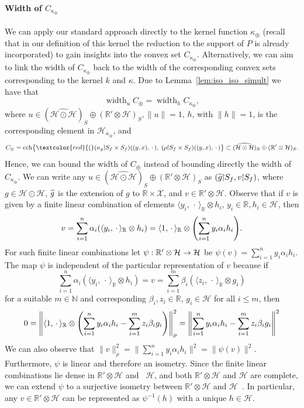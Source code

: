\documentclass[10pt]{amsart}
\theoremstyle{definition}\newtheorem{defi}[theo]{Definition}\newtheorem{rema}[theo]{Remark}\newtheorem{exam}[theo]{Example}\newtheorem{exem}[theo]{Example}\newtheorem{nota}[theo]{Notation}
\theoremstyle{remark}
\DeclareMathOperator{\cch}{cch}
\DeclareMathOperator{\diam}{width}
\newcommand{\restrr}
{\!\!\upharpoonright\!\!}
\newcommand{\R}{\mathbb{R}}
\newcommand{\dR}{{\R'}}
\newcommand{\bbN}{\mathbb{N}}
\newcommand{\X}{\mathcal{X}}
\newcommand{\cH}{\mathcal{H}}
\let\oldhat\hat
\renewcommand*{\hat}[1]{\mathchoice{\widehat{#1}}{\widehat{#1}}{\oldhat{#1}}{\oldhat{#1}}}
\renewcommand*{\to}{\mathchoice{\longrightarrow}{\rightarrow}{\rightarrow}{\rightarrow}}
\let\originalleft\left
\let\originalright\right
\renewcommand{\left}{\mathopen{}\mathclose\bgroup\originalleft}
\renewcommand{\right}{\aftergroup\egroup\originalright}
\begin{document}
\paragraph{Width of $C_{\kappa_\oplus}$}
We can apply our standard approach directly to the kernel function $\kappa_\oplus$ (recall that in our definition of this kernel the reduction to the support of $P$ is already incorporated) to gain insights into the convex set $C_{\kappa_\oplus}$. Alternatively, we can aim to link the width of $C_{\kappa_\oplus}$ back to the width of the corresponding convex sets corresponding to the kernel $k$ and $\kappa$. Due to Lemma~\ref{lem:iso_iso_simult} we have that
\[
\diam_{u} C_{\oplus} = \diam_{h} C_{\kappa_\oplus},
\]
where $u \in (\widehat{\cH \odot \cH})_S \oplus (\R' \otimes \cH)_S, \|u\| =1$, $h$, with $\|h\|=1$, is the corresponding element in $\cH_{\kappa_\oplus}$, and
\[
C_\oplus = \cch\bigl\{ \textcolor{red}{(}(\kappa_y \restrr S_f \times S_f)((y,x),\,\cdot\,),\; (\rho \restrr S_f \times S_f)((y,x),\,\cdot\,)\bigr\}\subset (\widehat{\cH \odot \cH})_S \oplus (\R' \otimes \cH)_S.
\]
Hence, we can bound the width of $C_\oplus$ instead of bounding directly the width of $C_{\kappa_\oplus}$. We can write any $u \in (\widehat{\cH \odot \cH})_S \oplus (\R' \otimes \cH)_S$ as $(\hat g\restrr S_f,v\restrr S_f)$, where $g \in \cH \odot \cH$, $\hat g$ is the extension of $g$ to $\R \times \X$, and $v \in \dR \otimes \cH$. Observe that if $v$ is given by a finite linear combination of elements $\langle y_i,\,\cdot\, \rangle_\R \otimes h_i$, $y_i \in \R, h_i \in \cH$, then
\begin{equation}\label{eq:dir_tens_helper}
v = \sum_{i=1}^n \alpha_i (\langle y_i, \,\cdot\, \rangle_\R \otimes h_i) = \langle 1, \,\cdot\, \rangle_\R \otimes \left(
\sum_{i=1}^n y_i \alpha_i h_i \right).
\end{equation}
For such finite linear combinations let $\psi: \dR \otimes \cH \to \cH$ be $\psi(v) =\sum_{i=1}^n y_i \alpha_i h_i$. The map $\psi$ is independent of the particular representation of $v$ because if
\[
\sum_{i=1}^n \alpha_i (\langle y_i, \,\cdot\, \rangle_\R \otimes h_i) = v = \sum_{i=1}^m \beta_i (\langle z_i, \,\cdot\, \rangle_\R \otimes g_i)
\]
for a suitable $m\in\bbN$ and corresponding $\beta_i,z_i \in \R$, $g_i \in \cH$ for all $i \leq m$, then
\[
0 = \left\| \langle 1, \,\cdot\, \rangle_\R \otimes \left(\sum_{i=1}^n y_i \alpha_i h_i - \sum_{i=1}^m z_i \beta_i g_i\right) \right\|^2_\rho =
\left\|\sum_{i=1}^n y_i \alpha_i h_i - \sum_{i=1}^m z_i \beta_i g_i\right\|^2
\]
We can also observe that $\|v\|^2_\rho = \| \sum_{i=1}^n y_i \alpha_i h_i\|^2 = \|\psi(v)\|^2$. Furthermore, $\psi$ is linear and therefore an isometry. Since the finite linear combinations lie dense in $\dR \otimes \cH$ and ~$\cH$, and both $\dR \otimes \cH$ and $\cH$ are complete, we can extend $\psi$ to a surjective isometry between $\dR \otimes \cH$ and $\cH$~\cite[Corollary~4.3.18]{ENG89}. In particular, any $v \in \dR \otimes \cH$ can be represented as $\psi^{-1}(h)$ with a unique $h\in \cH$.
\end{document}
